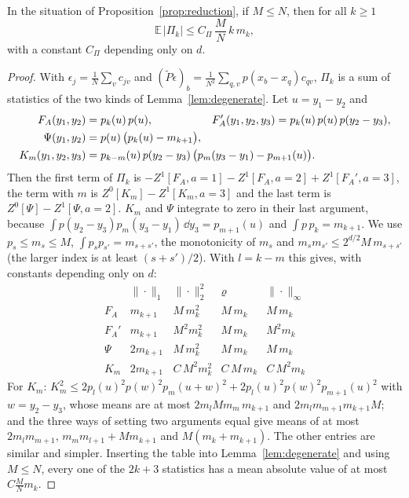 \begin{lemma}\label{lem:pibound}
In the situation of Proposition~\ref{prop:reduction}, if $M\le N$, then for all $k\ge1$
\[
\mathbb E\,|\Pi_k|\le C_\Pi\,\frac MN\,k\,m_k,
\]
with a constant $C_\Pi$ depending only on $d$.
\end{lemma}

\begin{proof}
With $\epsilon_j=\frac1N\sum_vc_{jv}$ and $(\tilde P\epsilon)_b=\frac1{N^2}\sum_{q,v}p(x_b-x_q)c_{qv}$, $\Pi_k$ is a sum of statistics of the two kinds of Lemma~\ref{lem:degenerate}. Let $u=y_1-y_2$ and
\begin{align*}
F_A(y_1,y_2)&=p_k(u)\,p(u),&F_A'(y_1,y_2,y_3)&=p_k(u)\,p(u)\,p(y_2-y_3),\\
\Psi(y_1,y_2)&=p(u)\,\big(p_k(u)-m_{k+1}\big),\\
K_m(y_1,y_2,y_3)&=\rlap{$p_{k-m}(u)\,p(y_2-y_3)\,\big(p_m(y_3-y_1)-p_{m+1}(u)\big).$}
\end{align*}
Then the first term of $\Pi_k$ is $-Z^1[F_A,a=1]-Z^1[F_A,a=2]+Z^1[F_A',a=3]$, the term with $m$ is $Z^0[K_m]-Z^1[K_m,a=3]$ and the last term is $Z^0[\Psi]-Z^1[\Psi,a=2]$. $K_m$ and $\Psi$ integrate to zero in their last argument, because $\int p(y_2-y_3)p_m(y_3-y_1)\,\dd y_3=p_{m+1}(u)$ and $\int p\,p_k=m_{k+1}$. We use $p_s\le m_s\le M$, $\int p_sp_{s'}=m_{s+s'}$, the monotonicity of $m_s$ and $m_sm_{s'}\le2^{d/2}M\,m_{s+s'}$ (the larger index is at least $(s+s')/2$). With $l=k-m$ this gives, with constants depending only on $d$:
\[
\begin{array}{lllll}
&\|\cdot\|_1&\|\cdot\|_2^2&\varrho&\|\cdot\|_\infty\\\hline
F_A&m_{k+1}&M\,m_k^2&M\,m_k&M\,m_k\\
F_A'&m_{k+1}&M^2m_k^2&M\,m_k&M^2m_k\\
\Psi&2m_{k+1}&M\,m_k^2&M\,m_k&M\,m_k\\
K_m&2m_{k+1}&C\,M^2m_k^2&C\,M\,m_k&C\,M^2m_k
\end{array}
\]
For $K_m$: $K_m^2\le2p_l(u)^2p(w)^2p_m(u+w)^2+2p_l(u)^2p(w)^2p_{m+1}(u)^2$ with $w=y_2-y_3$, whose means are at most $2m_lMm_m\,m_{k+1}$ and $2m_lm_{m+1}m_{k+1}M$; and the three ways of setting two arguments equal give means of at most $2m_lm_{m+1}$, $m_mm_{l+1}+Mm_{k+1}$ and $M(m_k+m_{k+1})$. The other entries are similar and simpler. Inserting the table into Lemma~\ref{lem:degenerate} and using $M\le N$, every one of the $2k+3$ statistics has a mean absolute value of at most $C\frac MNm_k$.
\end{proof}

